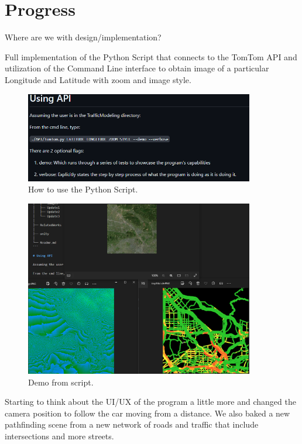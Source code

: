 \section{Progress}

Where are we with design/implementation?

Full implementation of the Python Script that connects to the TomTom API and utilization of the Command Line interface to obtain image of a particular Longitude and Latitude with zoom and image style.

\begin{figure}[!ht]
    \centering
    \includegraphics[width=10cm]{../Images/Update4/APIInstructions.png}
       \caption{How to use the Python Script.}
           \label{Fig:ConversionFunction}
\end{figure}

\begin{figure}[!ht]
    \centering
    \includegraphics[width=10cm]{../Images/Update4/DemoAPI.png}
       \caption{Demo from script.}
           \label{Fig:ConversionFunction}
\end{figure}

\begin{flushleft}
Starting to think about the UI/UX of the program a little more and changed the camera position to follow the car moving from a distance. We also baked a new pathfinding scene from a new network of roads and traffic that include intersections and more streets.
\end{flushleft}

